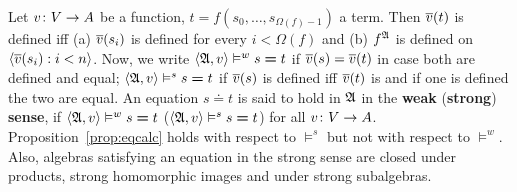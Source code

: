 Let $v \colon V \rightarrow A$ be a function, $t = f(s_0, \dotsc, s_{\Omega(f)-1})$ 
a term. Then $\overline{v}(t)$ is defined iff 
(a) $\overline{v}(s_i)$ is defined for every $i < \Omega(f)$ and (b)
$f^{\mathfrak{A}}$ is defined on $\langle \overline{v}(s_i) : i < n\rangle$. Now, we
write  $\langle \mathfrak{A}, v\rangle \vDash^w s \boldsymbol{=} t$ if $\overline{v}(s) =
\overline{v}(t)$ in case both are defined and equal; $\langle \mathfrak{A}, v\rangle \vDash^s s
\boldsymbol{=} t$ if $\overline{v}(s)$ is defined iff $\overline{v}(t)$
is and if one is defined the two are equal. An equation 
$s \boldsymbol{\doteq} t$ is said to hold in $\mathfrak{A}$ in the \textbf{weak} 
(\textbf{strong}) \textbf{sense}, if 
$\langle \mathfrak{A}, v\rangle \vDash^w s \boldsymbol{=} t$ 
($\langle \mathfrak{A}, v\rangle \vDash^s s \boldsymbol{=} t$) for all 
$v \colon V \rightarrow A$. Proposition~\ref{prop:eqcalc}
holds with respect to $\vDash^s$ but not with respect to
$\vDash^w$. Also, algebras satisfying an equation in the strong
sense are closed under products, strong homomorphic images and
under strong subalgebras.


